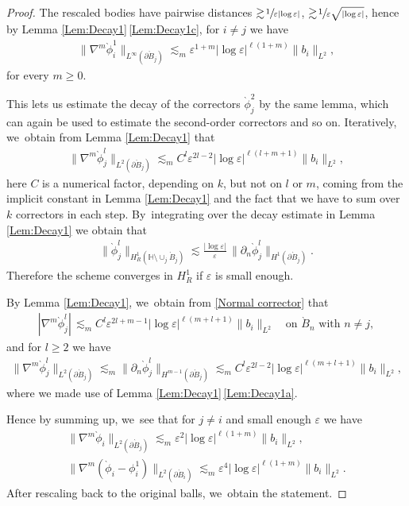 \documentclass[10pt]{amsart}
\let\epsilon\varepsilon
\let\backslash\setminus
\theoremstyle{definition}
\newcommand\anorm[1]{\lVert #1\rVert}
\newcommand\bnorm[1]{\bigl\lVert #1\bigr\rVert}
\let\de\partial
\let\eps\epsilon
\begin{document}
\begin{proof}
The rescaled bodies have pairwise distances $\gtrsim\!\sfrac{1}{\eps|{\log\eps}|}$, \resp $\gtrsim\!\sfrac{1}{\eps\sqrt{|{\log\eps}|}}$, hence by Lemma \ref{Lem:Decay1}\,\eqref{Lem:Decay1c}, for $i\neq j$ we have
\begin{align*}
\bnorm{\nabla^m\grave{\phi}_i^1}_{L^{\infty}(\de \grave{B}_j)}\lesssim_m \eps^{1+m}|{\log\eps}|^{\ell(1+m)} \anorm{b_i}_{L^2},
\end{align*}
for every $m\geq 0$.

This lets us estimate the decay of the correctors $\grave{\phi}_j^2$ by the same lemma, which can again be used to estimate the second-order correctors and so on. Iteratively, we~obtain from Lemma \ref{Lem:Decay1} that
\begin{align}\label{Normal corrector}
\bnorm{\nabla^m\grave{\phi}_j^l}_{L^2(\de \grave{B}_j)}\lesssim_m C^l\eps^{2l-2}|{\log\eps}|^{\ell (l+m+1)} \anorm{b_i}_{L^2},
\end{align}
here $C$ is a numerical factor, depending on $k$, but not on $l$ or $m$, coming from the implicit constant in Lemma \ref{Lem:Decay1} and the fact that we have to sum over $k$ correctors in each step. By~integrating over the decay estimate in Lemma \ref{Lem:Decay1} we obtain that
\begin{align}\label{L2 corrector}
\bnorm{\grave{\phi}_j^l}_{H_R^1(\mathbb{H}\backslash\cup_j \grave{B}_j)}\lesssim \frac{|{\log\eps}|}{\eps}\,\bnorm{\de_n\grave{\phi}_j^l}_{H^1(\de \grave{B}_j)}.
\end{align}
Therefore the scheme converges in $H_R^1$ if $\eps$ is small enough.

By Lemma \ref{Lem:Decay1}, we~obtain from \eqref{Normal corrector} that
\begin{align*}
|\nabla^m \grave{\phi}_j^l|\, \lesssim_m C^l\eps^{2l+m-1}|{\log\eps}|^{\ell (m+l+1)}\anorm{b_i}_{L^2}\quad\text{on $\grave{B}_n$ with $n\neq j$},
\end{align*}
and for $l\geq2$ we have
\begin{align*}
\bnorm{\nabla^m \grave{\phi}_j^l}_{L^2(\de \grave{B}_j)}\lesssim_m \bnorm{\de_n \grave{\phi}_j^l}_{H^{m-1}(\de \grave{B}_j)}\lesssim_m C^l\eps^{2l-2}|{\log\eps}|^{\ell (m+l+1)}\anorm{b_i}_{L^2},
\end{align*}
where we made use of Lemma \ref{Lem:Decay1}\,\eqref{Lem:Decay1a}.

Hence by summing up, we~see that for $j\neq i$ and small enough $\eps$ we have
\begin{align*}
\bnorm{\nabla^m\grave{\phi}_i}_{L^2(\de \grave{B}_j)}\lesssim_m \eps^{2}|{\log\eps}|^{\ell(1+m)}\anorm{b_i}_{L^2}, \\
\bnorm{\nabla^m(\grave{\phi}_i-\phi_i^1)}_{L^2(\de \grave{B}_i)}\lesssim_m \eps^{4}|{\log\eps}|^{\ell(1+m)}\anorm{b_i}_{L^2}.
\end{align*}
After rescaling back to the original balls, we~obtain the statement.
\end{proof}
\end{document}
